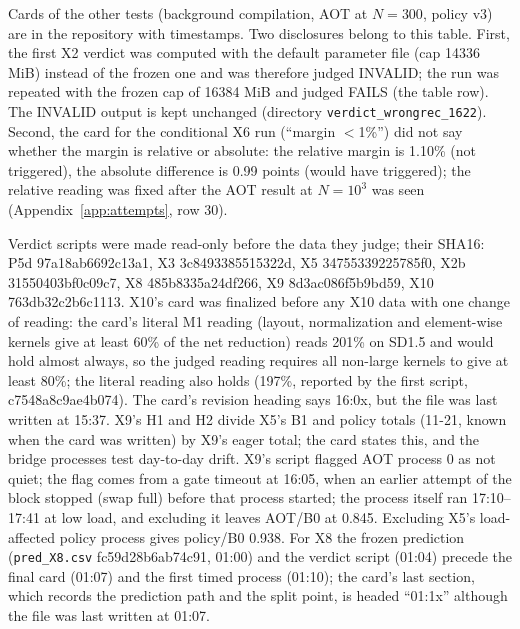 \documentclass[conference]{IEEEtran}
\newcommand{\tn}[1]{#1}%
\begin{document}
Cards of the other tests (background compilation, AOT at $N{=}300$, policy v3) are in the repository with timestamps. Two disclosures belong to this table. First, the first X2 verdict was computed with the default parameter file (cap 14336 MiB) instead of the frozen one and was therefore judged INVALID; the run was repeated with the frozen cap of 16384 MiB and judged FAILS (the table row). The INVALID output is kept unchanged (directory \texttt{verdict\_wrongrec\_1622}). Second, the card for the conditional X6 run (``margin $<$1\%'') did not say whether the margin is relative or absolute: the relative margin is 1.10\% (not triggered), the absolute difference is 0.99 points (would have triggered); the relative reading was fixed after the AOT result at $N{=}10^3$ was seen (Appendix~\ref{app:attempts}, row 30).

Verdict scripts were made read-only before the data they judge; their SHA16: P5d 97a18ab6692c13a1, X3 3c8493385515322d, X5 34755339225785f0, X2b 31550403bf0c09c7, X8 485b8335a24df266, X9 8d3ac086f5b9bd59, X10 763db32c2b6c1113. X10's card was finalized before any X10 data with one change of reading: the card's literal M1 reading (layout, normalization and element-wise kernels give at least 60\% of the net reduction) reads \tn{201\%} on SD1.5 and would hold almost always, so the judged reading requires all non-large kernels to give at least 80\%; the literal reading also holds (\tn{197\%}, reported by the first script, c7548a8c9ae4b074). The card's revision heading says 16:0x, but the file was last written at 15:37. X9's H1 and H2 divide X5's B1 and policy totals (11-21, known when the card was written) by X9's eager total; the card states this, and the bridge processes test day-to-day drift. X9's script flagged AOT process 0 as not quiet; the flag comes from a gate timeout at 16:05, when an earlier attempt of the block stopped (swap full) before that process started; the process itself ran 17:10--17:41 at low load, and excluding it leaves AOT/B0 at \tn{0.845}. Excluding X5's load-affected policy process gives policy/B0 \tn{0.938}. For X8 the frozen prediction (\texttt{pred\_X8.csv} fc59d28b6ab74c91, 01:00) and the verdict script (01:04) precede the final card (01:07) and the first timed process (01:10); the card's last section, which records the prediction path and the split point, is headed ``01:1x'' although the file was last written at 01:07.
\end{document}
